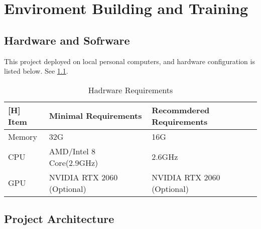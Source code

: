 
\chapter{Enviroment Building and Training} %

\label{Chapter3} %


\section{Hardware and Sofrware}
This project deployed on local personal computers, and hardware configuration is listed below. See \ref{tab:hardware}.
\begin{table}
\begin{tabular}{l l l}[H]
\toprule
\textbf{Item} & \textbf{Minimal Requirements} & \textbf{Recommdered Requirements} \\
\midrule
Memory & 32G & 16G  \\
CPU & AMD/Intel 8 Core(2.9GHz) & 2.6GHz \\
GPU& NVIDIA RTX 2060 (Optional) & NVIDIA RTX 2060 (Optional) \\
\bottomrule
\end{tabular}
\caption{Hadrware Requirements}
\label{tab:hardware}
\end{table}

\section{Project Architecture}

